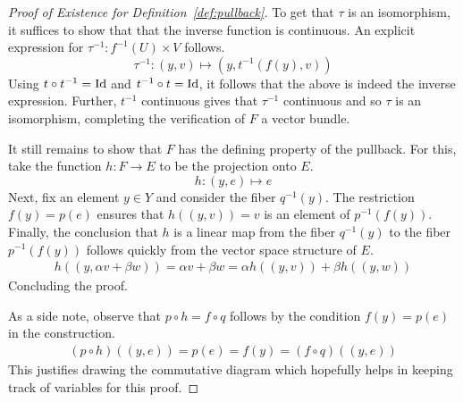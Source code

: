 \documentclass[../../sean_thesis.tex]{subfiles}
\begin{document}
\begin{proof}[Proof of Existence for Definition~\ref{def:pullback}]
To get that $\tau$ is an isomorphism, it suffices to show that that the inverse function is continuous. An explicit expression for $\tau^{-1}: f^{-1}(U) \times V$ follows.
\begin{equation*}
	\tau^{-1}: (y,v) \mapsto (y, t^{-1}(f(y),v))
\end{equation*}
Using $t \circ t^{-1} = \operatorname{Id}$ and $t^{-1} \circ t = \operatorname{Id}$, it follows that the above is indeed the inverse expression. Further, $t^{-1}$ continuous gives that $\tau^{-1}$ continuous and so $\tau$ is an isomorphism, completing the verification of $F$ a vector bundle.

It still remains to show that $F$ has the defining property of the pullback. For this, take the function $h: F \to E$ to be the projection onto $E$.
\begin{equation*}
	h: (y,e) \mapsto e
\end{equation*}
Next, fix an element $y \in Y$ and consider the fiber $q^{-1}(y)$. The restriction $f(y) = p(e)$ ensures that $h((y,v)) = v$ is an element of $p^{-1}(f(y))$. Finally, the conclusion that $h$ is a linear map from the fiber $q^{-1}(y)$ to the fiber $p^{-1}(f(y))$ follows quickly from the vector space structure of $E$.
\begin{align*}
	h((y, \alpha v + \beta w)) = \alpha v + \beta w = \alpha h ((y, v)) + \beta h((y, w))
\end{align*}
Concluding the proof.

As a side note, observe that $p \circ h = f \circ q$ follows by the condition $f(y) = p(e)$ in the construction.
\begin{align*}
	(p \circ h)((y,e)) = p(e) = f(y) = (f \circ q)((y,e))
\end{align*}
This justifies drawing the commutative diagram  which hopefully helps in keeping track of variables for this proof.

%	
%
%	

\end{proof}
\end{document}
